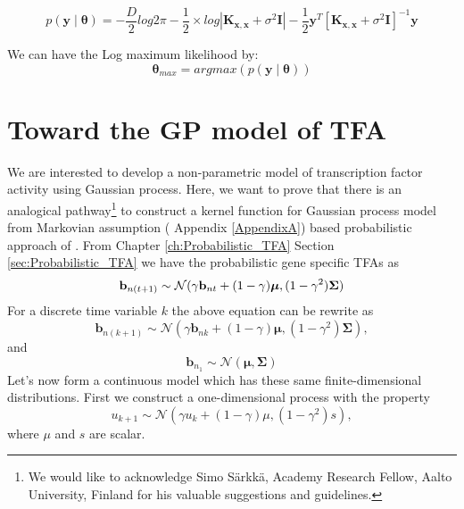 \begin{equation} \label{eq:Likelihood}
 p \left(\mathbf{y}\middle|\boldsymbol{\theta}\right) =
    - \frac{D}{2}log2\pi - \frac{1}{2}\times log \left| \mathbf{K_{x,x}} + \sigma^2\mathbf{I}\right|
    - \frac{1}{2}\mathbf{y}^T \left[\mathbf{K_{x,x}} + \sigma^2\mathbf{I} \right]^{-1}\mathbf{y}
\end{equation}

We can have the Log maximum likelihood by:
\begin{equation} \label{eq:LML}
 \boldsymbol{\theta}_{max} = argmax \left( p\left(\mathbf{y}\middle|\boldsymbol{\theta}\right) \right)
\end{equation}


\section{Toward the GP model of TFA}\label{Sec:Toward_TFA}
 We are interested to develop a non-parametric model of transcription factor activity using Gaussian process. Here, we want to prove that there is an analogical pathway\footnote{We would like to acknowledge Simo S\"arkk\"a, Academy Research Fellow, Aalto University, Finland for his valuable suggestions and guidelines.} to construct a kernel function for Gaussian process model from Markovian assumption ({\color{red} Appendix \ref{AppendixA}}) based probabilistic approach of \cite{Sanguinetti:2006}. From Chapter \ref{ch:Probabilistic_TFA} Section \ref{sec:Probabilistic_TFA} we have the probabilistic gene specific TFAs as
\begin{equation} \label{eq:tfa_SanG_updateCh4}
  \bold{b}_{n(t+1)} \sim \mathcal{N} (\gamma \bold{b}_{nt} + (1-\gamma)\boldsymbol{\mu},(1-\gamma^2)\bold{\Sigma})
\end{equation}
For a discrete time variable $k$ the above equation can be rewrite as
\begin{equation}
\textbf{b}_{n(k+1)} \sim \mathcal{N}\left(\gamma \textbf{b}_{nk} + (1 - \gamma) \boldsymbol{\mu}, (1 - \gamma^2) \boldsymbol{\Sigma}\right),
\end{equation}
and
\begin{equation}
\textbf{b}_{n_1} \sim \mathcal{N}\left(\boldsymbol{\mu}, \boldsymbol{\Sigma}\right)
\end{equation}
Let's now form a continuous model which has these same finite-dimensional distributions. First we construct a one-dimensional process with the property
\begin{equation}
u_{k+1} \sim \mathcal{N}\left(\gamma u_k + \left(1 - \gamma\right) \mu, (1 - \gamma^2)s \right),
\end{equation}
where $\mu$ and $s$ are scalar.

